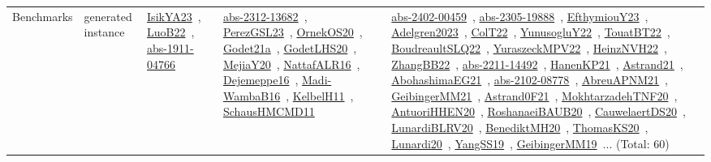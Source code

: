 {\begin{longtable}{lp{3cm}>{\raggedright\arraybackslash}p{6cm}>{\raggedright\arraybackslash}p{6cm}>{\raggedright\arraybackslash}p{8cm}}
Benchmarks & generated instance & \href{../works/IsikYA23.pdf}{IsikYA23}~\cite{IsikYA23}, \href{../works/LuoB22.pdf}{LuoB22}~\cite{LuoB22}, \href{../works/abs-1911-04766.pdf}{abs-1911-04766}~\cite{abs-1911-04766} & \href{../works/abs-2312-13682.pdf}{abs-2312-13682}~\cite{abs-2312-13682}, \href{../works/PerezGSL23.pdf}{PerezGSL23}~\cite{PerezGSL23}, \href{../works/OrnekOS20.pdf}{OrnekOS20}~\cite{OrnekOS20}, \href{../works/Godet21a.pdf}{Godet21a}~\cite{Godet21a}, \href{../works/GodetLHS20.pdf}{GodetLHS20}~\cite{GodetLHS20}, \href{../works/MejiaY20.pdf}{MejiaY20}~\cite{MejiaY20}, \href{../works/NattafALR16.pdf}{NattafALR16}~\cite{NattafALR16}, \href{../works/Dejemeppe16.pdf}{Dejemeppe16}~\cite{Dejemeppe16}, \href{../works/Madi-WambaB16.pdf}{Madi-WambaB16}~\cite{Madi-WambaB16}, \href{../works/KelbelH11.pdf}{KelbelH11}~\cite{KelbelH11}, \href{../works/SchausHMCMD11.pdf}{SchausHMCMD11}~\cite{SchausHMCMD11} & \href{../works/abs-2402-00459.pdf}{abs-2402-00459}~\cite{abs-2402-00459}, \href{../works/abs-2305-19888.pdf}{abs-2305-19888}~\cite{abs-2305-19888}, \href{../works/EfthymiouY23.pdf}{EfthymiouY23}~\cite{EfthymiouY23}, \href{../works/Adelgren2023.pdf}{Adelgren2023}~\cite{Adelgren2023}, \href{../works/ColT22.pdf}{ColT22}~\cite{ColT22}, \href{../works/YunusogluY22.pdf}{YunusogluY22}~\cite{YunusogluY22}, \href{../works/TouatBT22.pdf}{TouatBT22}~\cite{TouatBT22}, \href{../works/BoudreaultSLQ22.pdf}{BoudreaultSLQ22}~\cite{BoudreaultSLQ22}, \href{../works/YuraszeckMPV22.pdf}{YuraszeckMPV22}~\cite{YuraszeckMPV22}, \href{../works/HeinzNVH22.pdf}{HeinzNVH22}~\cite{HeinzNVH22}, \href{../works/ZhangBB22.pdf}{ZhangBB22}~\cite{ZhangBB22}, \href{../works/abs-2211-14492.pdf}{abs-2211-14492}~\cite{abs-2211-14492}, \href{../works/HanenKP21.pdf}{HanenKP21}~\cite{HanenKP21}, \href{../works/Astrand21.pdf}{Astrand21}~\cite{Astrand21}, \href{../works/AbohashimaEG21.pdf}{AbohashimaEG21}~\cite{AbohashimaEG21}, \href{../works/abs-2102-08778.pdf}{abs-2102-08778}~\cite{abs-2102-08778}, \href{../works/AbreuAPNM21.pdf}{AbreuAPNM21}~\cite{AbreuAPNM21}, \href{../works/GeibingerMM21.pdf}{GeibingerMM21}~\cite{GeibingerMM21}, \href{../works/Astrand0F21.pdf}{Astrand0F21}~\cite{Astrand0F21}, \href{../works/MokhtarzadehTNF20.pdf}{MokhtarzadehTNF20}~\cite{MokhtarzadehTNF20}, \href{../works/AntuoriHHEN20.pdf}{AntuoriHHEN20}~\cite{AntuoriHHEN20}, \href{../works/RoshanaeiBAUB20.pdf}{RoshanaeiBAUB20}~\cite{RoshanaeiBAUB20}, \href{../works/CauwelaertDS20.pdf}{CauwelaertDS20}~\cite{CauwelaertDS20}, \href{../works/LunardiBLRV20.pdf}{LunardiBLRV20}~\cite{LunardiBLRV20}, \href{../works/BenediktMH20.pdf}{BenediktMH20}~\cite{BenediktMH20}, \href{../works/ThomasKS20.pdf}{ThomasKS20}~\cite{ThomasKS20}, \href{../works/Lunardi20.pdf}{Lunardi20}~\cite{Lunardi20}, \href{../works/YangSS19.pdf}{YangSS19}~\cite{YangSS19}, \href{../works/GeibingerMM19.pdf}{GeibingerMM19}~\cite{GeibingerMM19}... (Total: 60)\\

\end{longtable}}
